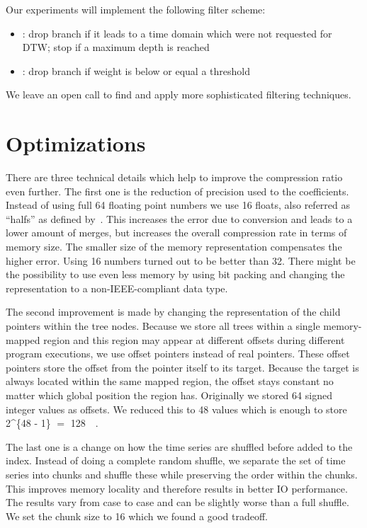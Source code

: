 Our experiments will implement the following filter scheme:

\begin{itemize}
    \item {}: drop branch if it leads to a time domain which were not requested for DTW\@; stop if a maximum depth is reached
    \item {}: drop branch if weight is below or equal a threshold
\end{itemize}

We leave an open call to find and apply more sophisticated filtering techniques.



\section{Optimizations}
\label{sec:algorithm:opt}

There are three technical details which help to improve the compression ratio even further. The first one is the reduction of precision used to the coefficients. Instead of using full \SI{64}{\bit} floating point numbers we use \SI{16}{\bit} floats, also referred as \enquote{halfs} as defined by~\cite{ieee_float}. This increases the error due to conversion and leads to a lower amount of merges, but increases the overall compression rate in terms of memory size. The smaller size of the memory representation compensates the higher error. Using \SI{16}{\bit} numbers turned out to be better than \SI{32}{\bit}. There might be the possibility to use even less memory by using bit packing and changing the representation to a non-IEEE-compliant data type.

The second improvement is made by changing the representation of the child pointers within the tree nodes. Because we store all trees within a single memory-mapped region and this region may appear at different offsets during different program executions, we use offset pointers instead of real pointers. These offset pointers store the offset from the pointer itself to its target. Because the target is always located within the same mapped region, the offset stays constant no matter which global position the region has. Originally we stored \SI{64}{\bit} signed integer values as offsets. We reduced this to \SI{48}{\bit} values which is enough to store \SI[parse-numbers = false]{2^{48 - 1}}{\byte} $=$ \SI{128}{\tera\byte}.

The last one is a change on how the time series are shuffled before added to the index. Instead of doing a complete random shuffle, we separate the set of time series into chunks and shuffle these while preserving the order within the chunks. This improves memory locality and therefore results in better IO performance. The results vary from case to case and can be slightly worse than a full shuffle. We set the chunk size to \num{16} which we found a good tradeoff.

